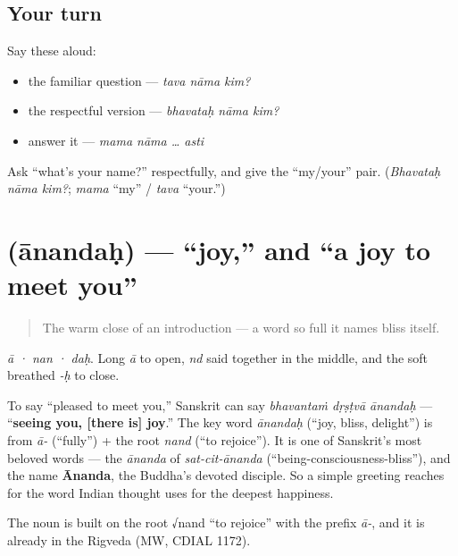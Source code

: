 \subsection*{Your turn}
Say these aloud:

\begin{itemize}
\raggedright
  \item the familiar question — \emph{tava nāma kim?}
  \item the respectful version — \emph{bhavataḥ nāma kim?}
  \item answer it — \emph{mama nāma … asti}
\end{itemize}

\begin{tcolorbox}[breakable,colback=teal!4,colframe=teal!35!black,title={Before you move on}]
Ask \textquotedblleft{}what's your name?\textquotedblright{} respectfully, and give the \textquotedblleft{}my/your\textquotedblright{} pair. (\emph{Bhavataḥ nāma kim?}; \emph{mama} \textquotedblleft{}my\textquotedblright{} / \emph{tava} \textquotedblleft{}your.\textquotedblright{})
\end{tcolorbox}
\section[\texorpdfstring{\sk{आनन्दः} (ānandaḥ)}{आनन्दः (ānandaḥ)}]{ (ānandaḥ) — \textquotedblleft{}joy,\textquotedblright{} and \textquotedblleft{}a joy to meet you\textquotedblright{}}

\label{lesson:SA-C02-anandah}



\begin{quote}
The warm close of an introduction — a word so full it names bliss itself.
\end{quote}

\begin{sounds}
\emph{ā · nan · daḥ}. Long \emph{ā} to open, \emph{nd} said together in the middle, and the soft breathed \emph{-ḥ} to close.
\end{sounds}

\begin{cousinweb}
To say \textquotedblleft{}pleased to meet you,\textquotedblright{} Sanskrit can say \emph{bhavantaṁ dṛṣṭvā ānandaḥ} — \textquotedblleft{}\textbf{seeing you, {[}there is{]} joy}.\textquotedblright{} The key word \emph{ānandaḥ} (\textquotedblleft{}joy, bliss, delight\textquotedblright{}) is from \emph{ā-} (\textquotedblleft{}fully\textquotedblright{}) + the root \emph{nand} (\textquotedblleft{}to rejoice\textquotedblright{}). It is one of Sanskrit's most beloved words — the \emph{ānanda} of \emph{sat-cit-ānanda} (\textquotedblleft{}being-consciousness-bliss\textquotedblright{}), and the name \textbf{Ānanda}, the Buddha's devoted disciple. So a simple greeting reaches for the word Indian thought uses for the deepest happiness.

The noun is built on the root √nand \textquotedblleft{}to rejoice\textquotedblright{} with the prefix \emph{ā-}, and it is already in the Rigveda (MW, CDIAL 1172).
\end{cousinweb}

